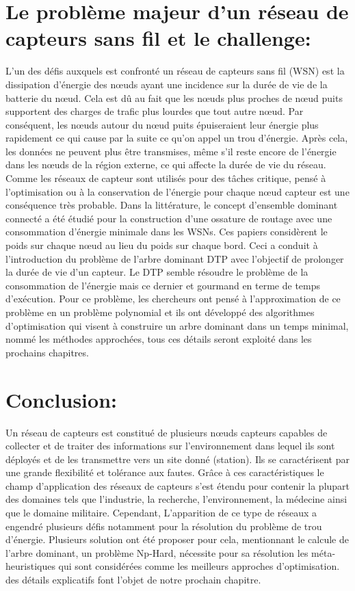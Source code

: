 \section{Le problème majeur d’un réseau de capteurs sans fil et le challenge:}
L'un des défis auxquels est confronté un réseau de capteurs sans fil (WSN) est la dissipation d'énergie des nœuds ayant une incidence sur la durée de vie de la batterie du nœud. Cela est dû au fait que les nœuds plus proches de nœud puits supportent des charges de trafic plus lourdes que tout autre nœud. Par conséquent, les nœuds autour du nœud puits épuiseraient leur énergie plus rapidement ce qui cause par la suite ce qu’on appel un trou d’énergie. Après cela, les données ne peuvent plus être transmises, même s'il reste encore de l'énergie dans les nœuds de la région externe, ce qui affecte la durée de vie du réseau. Comme les réseaux de capteur sont utilisés pour des tâches critique, pensé à l’optimisation ou à la conservation de  l’énergie pour chaque nœud capteur est une conséquence très probable.
Dans la littérature, le concept d’ensemble dominant connecté \cite{guha1998approximation,park2007dominating,thai2008construction,wan2002distributed} a été étudié pour la construction d’une ossature de routage avec une consommation d’énergie minimale dans les WSNs. Ces papiers considèrent le poids sur chaque nœud au lieu du poids sur chaque bord. Ceci a conduit à l'introduction du problème de l’arbre dominant DTP \cite{shin2010approximation,zhang2008new} avec l'objectif de prolonger la durée de vie d’un capteur. \cite{sundar2014steady}
Le DTP semble résoudre le problème de la consommation de l’énergie mais ce dernier et gourmand en terme de temps d’exécution. Pour ce problème, les chercheurs ont pensé à l’approximation de ce problème en un problème polynomial et ils ont développé des algorithmes  d’optimisation qui visent à construire un arbre dominant dans un temps minimal, nommé les méthodes approchées, tous ces détails seront exploité dans les prochains chapitres.

\section{Conclusion:}
Un réseau de capteurs est constitué de plusieurs nœuds capteurs capables  de collecter et de traiter des informations sur l'environnement dans lequel ils sont déployés et de les transmettre vers un site donné (station). Ils se caractérisent par une grande flexibilité et tolérance aux fautes. Grâce à ces caractéristiques le champ d'application des réseaux de capteurs s'est étendu pour contenir la plupart des domaines tels que l’industrie, la recherche, l’environnement, la médecine ainsi que le domaine militaire. Cependant, L’apparition de ce type de réseaux a engendré plusieurs défis notamment pour la résolution du problème de trou d’énergie. Plusieurs solution ont été proposer pour cela, mentionnant le calcule de l’arbre dominant, un problème Np-Hard, nécessite pour sa résolution les méta-heuristiques qui sont considérées comme les meilleurs approches d’optimisation. des détails explicatifs font l’objet de notre prochain chapitre.


